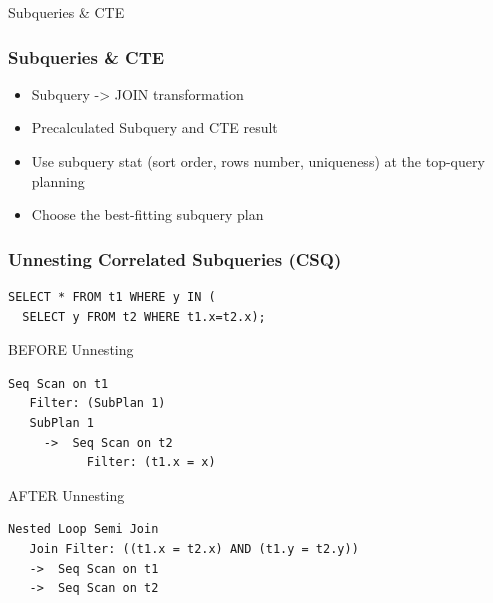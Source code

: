 \documentclass{beamer}
\begin{document}

\begin{frame}
\vspace*{\fill}
\begin{center}
Subqueries \& CTE
\end{center}
\vspace*{\fill}
\end{frame}

\begin{frame}\frametitle{Subqueries \& CTE}
\begin{itemize}
  \item Subquery -> JOIN transformation
  \item Precalculated Subquery and CTE result
  \item Use subquery stat (sort order, rows number, uniqueness) at the top-query planning
  \item Choose the best-fitting subquery plan
\end{itemize}
\end{frame}


\begin{frame}[fragile]\frametitle{Unnesting Correlated Subqueries (CSQ)}
\begin{lstlisting}
SELECT * FROM t1 WHERE y IN (
  SELECT y FROM t2 WHERE t1.x=t2.x);
\end{lstlisting}

\begin{block}{BEFORE Unnesting}
\begin{lstlisting}[basicstyle=\footnotesize]
 Seq Scan on t1
   Filter: (SubPlan 1)
   SubPlan 1
     ->  Seq Scan on t2
           Filter: (t1.x = x)
\end{lstlisting}\end{block}

\begin{block}{AFTER Unnesting}
\begin{lstlisting}[basicstyle=\footnotesize]
 Nested Loop Semi Join
   Join Filter: ((t1.x = t2.x) AND (t1.y = t2.y))
   ->  Seq Scan on t1
   ->  Seq Scan on t2
\end{lstlisting}\end{block}
\end{frame}
\end{document}
